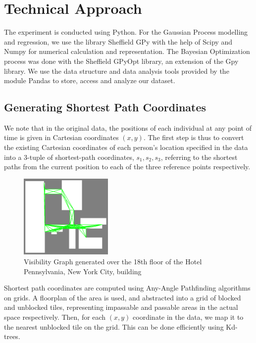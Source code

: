 \documentclass[letterpaper]{article}
\begin{document}
\section{Technical Approach}
The experiment is conducted using Python. For the Gaussian Process modelling and regression, we use the library Sheffield GPy with the help of Scipy and Numpy for numerical calculation and representation. The Bayesian Optimization process was done with the Sheffield GPyOpt library, an extension of the Gpy library. We use the data structure and data analysis tools provided by the module Pandas to store, access and analyze our dataset.

\subsection{Generating Shortest Path Coordinates}

We note that in the original data, the positions of each individual at any point of time is given in Cartesian coordinates $(x,y)$. The first step is thus to convert the existing Cartesian coordinates of each person's location specified in the data into a 3-tuple of shortest-path coordinates, $s_1, s_2, s_3$, referring to the shortest paths from the current position to each of the three reference points respectively.\\

\begin{figure}[!h]
  \centering
    \includegraphics[width=170px]{diagrams/floor18visibilitygraph.png}
  \caption{Visibility Graph generated over the 18th floor of the Hotel Pennsylvania, New York City, building}
  \label{fig:floor18vg}
\end{figure}

Shortest path coordinates are computed using Any-Angle Pathfinding algorithms on grids. A floorplan of the area is used, and abstracted into a grid of blocked and unblocked tiles, representing impassable and passable areas in the actual space respectively. Then, for each $(x,y)$ coordinate in the data, we map it to the nearest unblocked tile on the grid. This can be done efficiently using Kd-trees.\\
\end{document}
